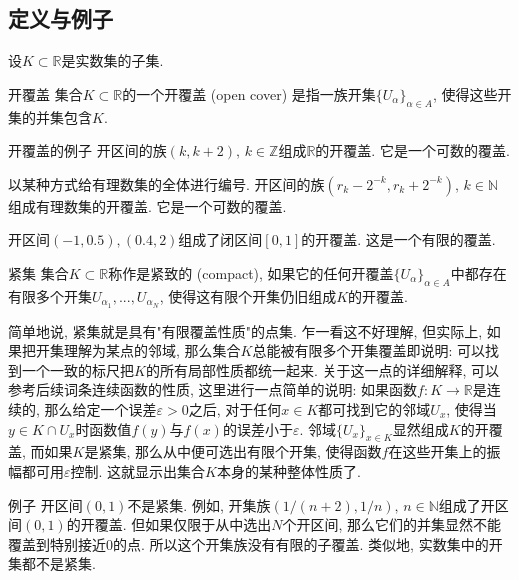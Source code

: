 \subsection{定义与例子}
设$K\subset\mathbb{R}$是实数集的子集.
\begin{definition}{开覆盖}
集合$K\subset\mathbb{R}$的一个开覆盖 (open cover) 是指一族开集$\{U_{\alpha}\}_{\alpha\in A}$, 使得这些开集的并集包含$K$.
\end{definition}

\begin{example}{开覆盖的例子}
开区间的族$(k,k+2),\,k\in\mathbb{Z}$组成$\mathbb{R}$的开覆盖. 它是一个可数的覆盖.

以某种方式给有理数集的全体进行编号. 开区间的族$(r_k-2^{-k},r_k+2^{-k}),\,k\in\mathbb{N}$组成有理数集的开覆盖. 它是一个可数的覆盖.

开区间$(-1,0.5),(0.4,2)$组成了闭区间$[0,1]$的开覆盖. 这是一个有限的覆盖.
\end{example}

\begin{definition}{紧集}
集合$K\subset\mathbb{R}$称作是紧致的 (compact), 如果它的任何开覆盖$\{U_{\alpha}\}_{\alpha\in A}$中都存在有限多个开集$U_{\alpha_1},...,U_{\alpha_N}$, 使得这有限个开集仍旧组成$K$的开覆盖. 
\end{definition}

简单地说, 紧集就是具有"有限覆盖性质"的点集. 乍一看这不好理解, 但实际上, 如果把开集理解为某点的邻域, 那么集合$K$总能被有限多个开集覆盖即说明: 可以找到一个一致的标尺把$K$的所有局部性质都统一起来. 关于这一点的详细解释, 可以参考后续词条连续函数的性质, 这里进行一点简单的说明: 如果函数$f:K\to\mathbb{R}$是连续的, 那么给定一个误差$\varepsilon>0$之后, 对于任何$x\in K$都可找到它的邻域$U_{x}$, 使得当$y\in K\cap U_x$时函数值$f(y)$与$f(x)$的误差小于$\varepsilon$. 邻域$\{U_x\}_{x\in K}$显然组成$K$的开覆盖, 而如果$K$是紧集, 那么从中便可选出有限个开集, 使得函数$f$在这些开集上的振幅都可用$\varepsilon$控制. 这就显示出集合$K$本身的某种整体性质了.

\begin{example}{例子}
开区间$(0,1)$不是紧集. 例如, 开集族$(1/(n+2),1/n),\,n\in\mathbb{N}$组成了开区间$(0,1)$的开覆盖. 但如果仅限于从中选出$N$个开区间, 那么它们的并集显然不能覆盖到特别接近$0$的点. 所以这个开集族没有有限的子覆盖. 类似地, 实数集中的开集都不是紧集.

\end{example}